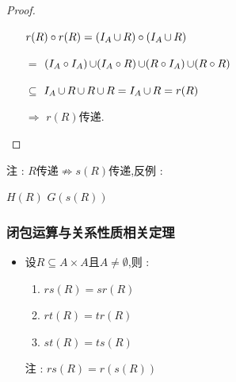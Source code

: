 {{{\begin{enumerate}
{\begin{proof}
            \begin{itemize}
              \item[] $r(R) \circ r(R) = (I_A \operatorname{\cup} R) \circ (I_A \operatorname{\cup} R)$
              \item[$=$] $(I_A \circ I_A) \operatorname{\cup} (I_A \circ R) \operatorname{\cup} (R \circ I_A) \operatorname{\cup} (R \circ R)$
              \item[$\subseteq$] $I_A \operatorname{\cup} R \operatorname{\cup} R \operatorname{\cup} R = I_A \operatorname{\cup} R = r(R)$
              \item[$\Rightarrow$] $r(R)$传递.
            \end{itemize}
          \end{proof}

          注 : $R$传递$ \nRightarrow s(R)$传递,反例 :
          \begin{center}

            $H(R)$ \qquad $G(s(R))$
          \end{center}
          }
  \end{enumerate}
}%

\subsubsection{闭包运算与关系性质相关定理}{
  \begin{itemize}
    \item {
          设$R \subseteq A \times A$且$A \neq \emptyset$,则 : \begin{enumerate}
            \item $rs(R) = sr(R)$
            \item $rt(R) = tr(R)$
            \item $st(R) = ts(R)$
          \end{enumerate}

          注 : $rs(R) = r(s(R))$

}
\end{itemize}}}}
